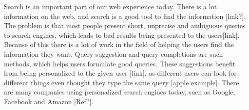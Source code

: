   Search is an important part of our web experience today. There is a lot information on the web, and search is a good tool to find the information [link?]. The problem is that most people present short, unprecise and ambiguous queries to search engines, which leads to bad results being presented to the users[link]. Because of this there is a lot of work in the field of helping the users find the information they want. Query suggestion and query completions are such methods, which helps users formulate good queries. These suggestions benefit from being personalized to the given user [link], as different users can look for different things even thought they type the same query [apple example]. There are many companies using personalized search engines today, such as Google, Facebook and Amazon [Ref?].

